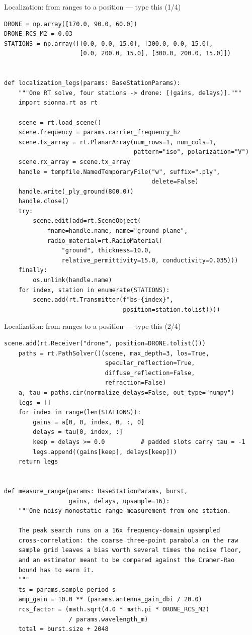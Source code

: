 \documentclass[10pt]{beamer}
\begin{document}
\begin{frame}[fragile]{Localization: from ranges to a position --- type this (1/4)}
\begin{lstlisting}[basicstyle=\ttfamily\tiny]
DRONE = np.array([170.0, 90.0, 60.0])
DRONE_RCS_M2 = 0.03
STATIONS = np.array([[0.0, 0.0, 15.0], [300.0, 0.0, 15.0],
                     [0.0, 200.0, 15.0], [300.0, 200.0, 15.0]])


def localization_legs(params: BaseStationParams):
    """One RT solve, four stations -> drone: [(gains, delays)]."""
    import sionna.rt as rt

    scene = rt.load_scene()
    scene.frequency = params.carrier_frequency_hz
    scene.tx_array = rt.PlanarArray(num_rows=1, num_cols=1,
                                    pattern="iso", polarization="V")
    scene.rx_array = scene.tx_array
    handle = tempfile.NamedTemporaryFile("w", suffix=".ply",
                                         delete=False)
    handle.write(_ply_ground(800.0))
    handle.close()
    try:
        scene.edit(add=rt.SceneObject(
            fname=handle.name, name="ground-plane",
            radio_material=rt.RadioMaterial(
                "ground", thickness=10.0,
                relative_permittivity=15.0, conductivity=0.035)))
    finally:
        os.unlink(handle.name)
    for index, station in enumerate(STATIONS):
        scene.add(rt.Transmitter(f"bs-{index}",
                                 position=station.tolist()))
\end{lstlisting}
\end{frame}

\begin{frame}[fragile]{Localization: from ranges to a position --- type this (2/4)}
\begin{lstlisting}[basicstyle=\ttfamily\tiny]
    scene.add(rt.Receiver("drone", position=DRONE.tolist()))
    paths = rt.PathSolver()(scene, max_depth=3, los=True,
                            specular_reflection=True,
                            diffuse_reflection=False,
                            refraction=False)
    a, tau = paths.cir(normalize_delays=False, out_type="numpy")
    legs = []
    for index in range(len(STATIONS)):
        gains = a[0, 0, index, 0, :, 0]
        delays = tau[0, index, :]
        keep = delays >= 0.0          # padded slots carry tau = -1
        legs.append((gains[keep], delays[keep]))
    return legs


def measure_range(params: BaseStationParams, burst,
                  gains, delays, upsample=16):
    """One noisy monostatic range measurement from one station.

    The peak search runs on a 16x frequency-domain upsampled
    cross-correlation: the coarse three-point parabola on the raw
    sample grid leaves a bias worth several times the noise floor,
    and an estimator meant to be compared against the Cramer-Rao
    bound has to earn it.
    """
    ts = params.sample_period_s
    amp_gain = 10.0 ** (params.antenna_gain_dbi / 20.0)
    rcs_factor = (math.sqrt(4.0 * math.pi * DRONE_RCS_M2)
                  / params.wavelength_m)
    total = burst.size + 2048
\end{lstlisting}
\end{frame}
\end{document}
